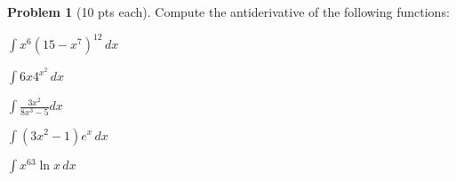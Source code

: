 \documentclass[12pt]{article}
\theoremstyle{definition}
\newtheorem{problem}{Problem}
\begin{document}
\bigskip
\begin{problem}[10 pts each]
Compute the antiderivative of the following functions:
\item $\displaystyle{\int x^6 (15 - x^7)^{12}\, dx}$
\vspace{2cm}
\item $\displaystyle{\int  6x 4^{x^2} \, dx}$
\vspace{2cm}
\item $\displaystyle{\int \frac{3x^2}{8x^3-5} dx}$
\vspace{4cm}
\item $\displaystyle{\int (3x^2-1) e^x\, dx}$
\vspace{4cm}
\item $\displaystyle{\int x^{63} \ln x\, dx}$
\vspace{4cm}
\end{problem}
\end{document}
